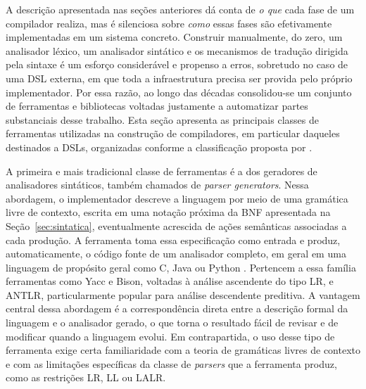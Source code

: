 \documentclass[
    12pt
    ,oneside
    ,a4paper
    ,chapter=TITLE
    ,section=TITLE
    ,sumario=abnt-6027-2012]{abntex2}
\begin{document}
A descrição apresentada nas seções anteriores dá conta de \textit{o que} cada fase de um
compilador realiza, mas é silenciosa sobre \textit{como} essas fases são efetivamente
implementadas em um sistema concreto. Construir manualmente, do zero, um analisador léxico, um
analisador sintático e os mecanismos de tradução dirigida pela sintaxe é um esforço considerável
e propenso a erros, sobretudo no caso de uma DSL externa, em que toda a infraestrutura precisa
ser provida pelo próprio implementador. Por essa razão, ao longo das décadas consolidou-se um
conjunto de ferramentas e bibliotecas voltadas justamente a automatizar partes substanciais
desse trabalho. Esta seção apresenta as principais classes de ferramentas utilizadas na
construção de compiladores, em particular daqueles destinados a DSLs, organizadas conforme a
classificação proposta por .

A primeira e mais tradicional classe de ferramentas é a dos geradores de analisadores
sintáticos, também chamados de \textit{parser generators}. Nessa abordagem, o implementador
descreve a linguagem por meio de uma gramática livre de contexto, escrita em uma notação
próxima da BNF apresentada na Seção~\ref{sec:sintatica}, eventualmente acrescida de ações
semânticas associadas a cada produção. A ferramenta toma essa especificação como entrada e
produz, automaticamente, o código fonte de um analisador completo, em geral em uma linguagem de
propósito geral como C, Java ou Python \cite{fowler2010}. Pertencem a essa família ferramentas
como Yacc e Bison, voltadas à análise ascendente do tipo LR, e ANTLR, particularmente popular
para análise descendente preditiva. A vantagem central dessa abordagem é a correspondência
direta entre a descrição formal da linguagem e o analisador gerado, o que torna o resultado
fácil de revisar e de modificar quando a linguagem evolui. Em contrapartida, o uso desse tipo
de ferramenta exige certa familiaridade com a teoria de gramáticas livres de contexto e com as
limitações específicas da classe de \textit{parsers} que a ferramenta produz, como as restrições
LR, LL ou LALR.
\end{document}
